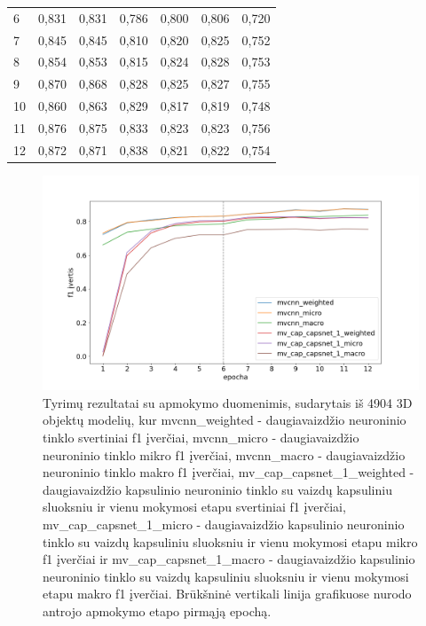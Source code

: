 \begin{table}[]
\begin{tabular}{l|l|l|l|l|l|l}
		6 &          0,831 &       0,831 &       0,786 &                     0,800 &                  0,806 &                  0,720 \\
		7 &          0,845 &       0,845 &       0,810 &                     0,820 &                  0,825 &                  0,752 \\
		8 &          0,854 &       0,853 &       0,815 &                     0,824 &                  0,828 &                  0,753 \\
		9 &          0,870 &       0,868 &       0,828 &                     0,825 &                  0,827 &                  0,755 \\
		10 &          0,860 &       0,863 &       0,829 &                     0,817 &                  0,819 &                  0,748 \\
		11 &          0,876 &       0,875 &       0,833 &                     0,823 &                  0,823 &                  0,756 \\
		12 &          0,872 &       0,871 &       0,838 &                     0,821 &                  0,822 &                  0,754 \\
	\end{tabular}
	\label{tbl:half_sample_f1}
\end{table}

\begin{figure}[H]
	\centering
	\includegraphics[scale=0.4]{img/half_sample_f1.png}
	\caption{
		Tyrimų rezultatai su apmokymo duomenimis, sudarytais iš 4904 3D objektų modelių, kur mvcnn\_weighted -  daugiavaizdžio neuroninio tinklo svertiniai f1 įverčiai, 
		mvcnn\_micro -  daugiavaizdžio neuroninio tinklo mikro f1 įverčiai, 
		mvcnn\_macro -  daugiavaizdžio neuroninio tinklo makro f1 įverčiai, 
		mv\_cap\_capsnet\_1\_weighted - daugiavaizdžio kapsulinio neuroninio tinklo su vaizdų kapsuliniu sluoksniu ir vienu mokymosi etapu svertiniai f1 įverčiai, 
		mv\_cap\_capsnet\_1\_micro - daugiavaizdžio kapsulinio neuroninio tinklo su vaizdų kapsuliniu sluoksniu ir vienu mokymosi etapu mikro f1 įverčiai ir
		mv\_cap\_capsnet\_1\_macro - daugiavaizdžio kapsulinio neuroninio tinklo su vaizdų kapsuliniu sluoksniu ir vienu mokymosi etapu makro f1 įverčiai. Brūkšninė vertikali linija grafikuose nurodo antrojo apmokymo etapo pirmąją epochą.
	}
	\label{img:half_sample_f1}
\end{figure}

